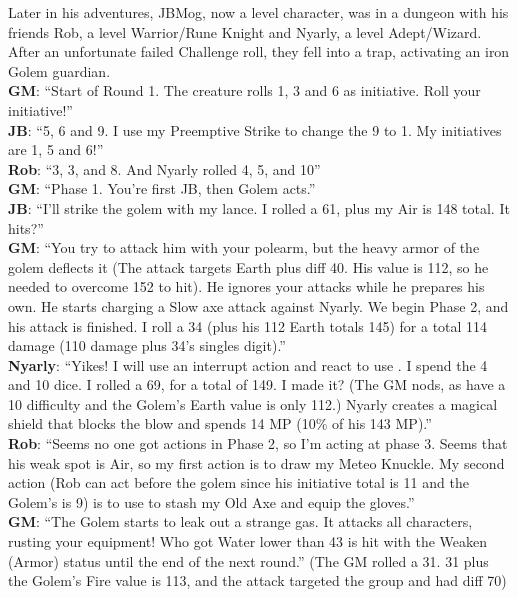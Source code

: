 \begin{multimog}
Later in his adventures, JBMog, now a  level character, was in a dungeon with his friends Rob, a  level Warrior/Rune Knight and Nyarly, a  level Adept/Wizard. After an unfortunate failed Challenge roll, they fell into a trap, activating an iron Golem guardian. \\
\textbf{GM}: \enquote{Start of Round 1. The creature rolls 1, 3 and 6 as initiative. Roll your initiative!} \\
\textbf{JB}: \enquote{5, 6 and 9. I use my Preemptive Strike to change the 9 to 1. My initiatives are 1, 5 and 6!} \\
\textbf{Rob}: \enquote{3, 3, and 8. And Nyarly rolled 4, 5, and 10} \\
\textbf{GM}: \enquote{Phase 1. You're first JB, then Golem acts.} \\
\textbf{JB}: \enquote{I'll strike the golem with my lance. I rolled a 61, plus my Air is 148 total. It hits?} \\
\textbf{GM}: \enquote{You try to attack him with your polearm, but the heavy armor of the golem deflects it (The attack targets Earth plus diff 40. His value is 112, so he needed to overcome 152 to hit). He ignores your attacks while he prepares his own. He starts charging a Slow axe attack against Nyarly. We begin Phase 2, and his attack is finished. I roll a 34 (plus his 112 Earth totals 145) for a total 114 damage (110 damage plus 34's singles digit).} \\
\textbf{Nyarly}: \enquote{Yikes! I will use an interrupt action and react to use . I spend the 4 and 10 dice. I rolled a 69, for a total of 149. I made it? (The GM nods, as  have a 10 difficulty and the Golem's Earth value is only 112.) Nyarly creates a magical shield that blocks the blow and spends 14 MP (10\% of his 143 MP).} \\
\textbf{Rob}: \enquote{Seems no one got actions in Phase 2, so I'm acting at phase 3. Seems that his weak spot is Air, so my first action is to draw my Meteo Knuckle. My second action (Rob can act before the golem since his initiative total is 11 and the Golem's is 9) is to use  to stash my Old Axe and equip the gloves.} \\
\textbf{GM}: \enquote{The Golem starts to leak out a strange gas. It attacks all characters, rusting your equipment! Who got Water lower than 43 is hit with the Weaken (Armor) status until the end of the next round.} (The GM rolled a 31. 31 plus the Golem's Fire value is 113, and the attack targeted the group and had diff 70) \\

\end{multimog}
